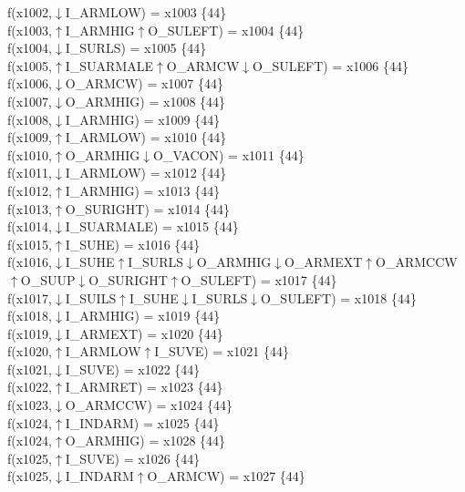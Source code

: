 f(x1002,$\downarrow$I\_ARMLOW) = x1003 \{44\} \\  
f(x1003,$\uparrow$I\_ARMHIG$\uparrow$O\_SULEFT) = x1004 \{44\} \\  
f(x1004,$\downarrow$I\_SURLS) = x1005 \{44\} \\  
f(x1005,$\uparrow$I\_SUARMALE$\uparrow$O\_ARMCW$\downarrow$O\_SULEFT) = x1006 \{44\} \\  
f(x1006,$\downarrow$O\_ARMCW) = x1007 \{44\} \\  
f(x1007,$\downarrow$O\_ARMHIG) = x1008 \{44\} \\  
f(x1008,$\downarrow$I\_ARMHIG) = x1009 \{44\} \\  
f(x1009,$\uparrow$I\_ARMLOW) = x1010 \{44\} \\  
f(x1010,$\uparrow$O\_ARMHIG$\downarrow$O\_VACON) = x1011 \{44\} \\  
f(x1011,$\downarrow$I\_ARMLOW) = x1012 \{44\} \\  
f(x1012,$\uparrow$I\_ARMHIG) = x1013 \{44\} \\  
f(x1013,$\uparrow$O\_SURIGHT) = x1014 \{44\} \\  
f(x1014,$\downarrow$I\_SUARMALE) = x1015 \{44\} \\  
f(x1015,$\uparrow$I\_SUHE) = x1016 \{44\} \\  
f(x1016,$\downarrow$I\_SUHE$\uparrow$I\_SURLS$\downarrow$O\_ARMHIG$\downarrow$O\_ARMEXT$\uparrow$O\_ARMCCW$\uparrow$O\_SUUP$\downarrow$O\_SURIGHT$\uparrow$O\_SULEFT) = x1017 \{44\} \\  
f(x1017,$\downarrow$I\_SUILS$\uparrow$I\_SUHE$\downarrow$I\_SURLS$\downarrow$O\_SULEFT) = x1018 \{44\} \\  
f(x1018,$\downarrow$I\_ARMHIG) = x1019 \{44\} \\  
f(x1019,$\downarrow$I\_ARMEXT) = x1020 \{44\} \\  
f(x1020,$\uparrow$I\_ARMLOW$\uparrow$I\_SUVE) = x1021 \{44\} \\  
f(x1021,$\downarrow$I\_SUVE) = x1022 \{44\} \\  
f(x1022,$\uparrow$I\_ARMRET) = x1023 \{44\} \\  
f(x1023,$\downarrow$O\_ARMCCW) = x1024 \{44\} \\  
f(x1024,$\uparrow$I\_INDARM) = x1025 \{44\} \\  
f(x1024,$\uparrow$O\_ARMHIG) = x1028 \{44\} \\  
f(x1025,$\uparrow$I\_SUVE) = x1026 \{44\} \\  
f(x1025,$\downarrow$I\_INDARM$\uparrow$O\_ARMCW) = x1027 \{44\} \\  
